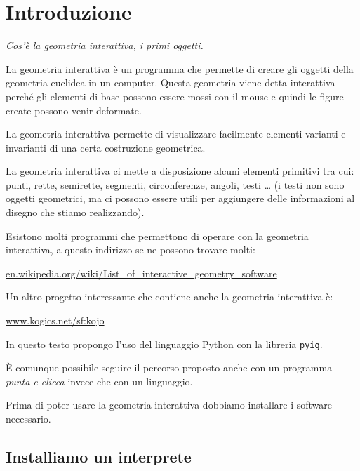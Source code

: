 \section{Introduzione}
\label{sec:introduzione}

\emph{Cos'è la geometria interattiva, i primi oggetti.}

La geometria interattiva è un programma che permette di creare gli oggetti 
della geometria euclidea in un computer.
Questa geometria viene detta interattiva perché gli elementi di base possono 
essere mossi con il mouse e quindi le figure create possono venir deformate.

La geometria interattiva permette di visualizzare facilmente elementi
varianti e invarianti di una certa costruzione geometrica.

La geometria interattiva ci mette a disposizione alcuni elementi primitivi tra 
cui: punti, rette, semirette, segmenti, circonferenze, angoli, testi \dots
(i testi non sono oggetti geometrici, ma ci possono essere utili per aggiungere 
delle informazioni al disegno che stiamo realizzando).


Esistono molti programmi che permettono di operare con la geometria
interattiva, a questo indirizzo se ne possono trovare molti:

\url{en.wikipedia.org/wiki/List_of_interactive_geometry_software}

Un altro progetto interessante che contiene anche la geometria interattiva è:

\url{www.kogics.net/sf:kojo}

In questo testo propongo l'uso del linguaggio 
Python con la libreria \texttt{pyig}.

È comunque possibile seguire il percorso proposto anche con un programma
\emph{punta e clicca} invece che con un linguaggio.

Prima di poter usare la geometria interattiva dobbiamo installare i  software 
necessario.

\subsection{Installiamo un interprete}
\label{sec:05_02installazione}

